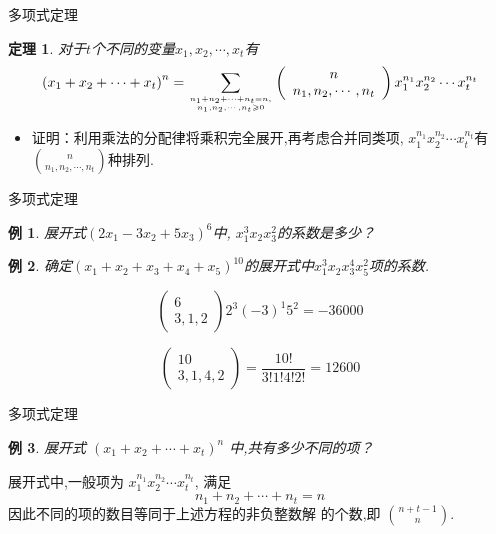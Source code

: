 \documentclass[punct]{ctexbeamer}
\newtheorem{thm}{定理}[section]
\newtheorem{ex}{例}[section]
\begin{document}
\begin{frame}{多项式定理}
	\begin{thm}
	对于$t$个不同的变量$x_{1}, x_{2}, \cdots, x_{t}$有
	$$
	\left(x_{1}+x_{2}+\cdots+x_{t}\right)^{n}=\sum_{n_{1}+n_{2}+\cdots+n_{t}=n, \atop n_{1}, n_{2}, \cdots, n_{t} \geqslant 0}\left(\begin{array}{c}
	n \\ n_{1}, n_{2}, \cdots, n_{t}
	\end{array}\right) x_{1}^{n_{1}} x_{2}^{n_{2}} \cdots x_{t}^{n_{t}}
	$$

	\end{thm}
	\begin{itemize}
	\item  证明：利用乘法的分配律将乘积完全展开,再考虑合并同类项,
	$x_{1}^{n_{1}} x_{2}^{n_{2}} \cdots x_{t}^{n_{t}}$有$\binom{n}{n_{1}, n_{2}, \cdots, n_{t}}$种排列.

	\end{itemize}

\end{frame}


\begin{frame}{多项式定理}


	\begin{ex}
		展开式$(2x_{1}-3x_{2}+5x_{3})^6$中, $x_{1}^{3}x_2x_3^2$的系数是多少？
	\end{ex}

	\begin{ex}
    确定$\left(x_{1}+x_{2}+x_{3}+x_{4}+x_{5}\right)^{10}$的展开式中$ x_{1}^{3} x_{2} x_{3}^{4} x_{5}^{2}$项的系数.
\end{ex}


\pause
		$$
		\left(\begin{array}{c}
		6 \\ 3,1,2
		\end{array}\right) 2^{3}(-3)^{1} 5^{2}=-36000
		$$

\pause
\[\left(\begin{array}{c}
    10 \\
    3,1,4,2
\end{array}\right)=\frac{10 !}{3 ! 1 ! 4 ! 2 !}=12600\]


\end{frame}

\begin{frame}{多项式定理}

	\begin{ex}
		展开式 $\left(x_{1}+x_{2}+\cdots+x_{t}\right)^{n}$ 中,共有多少不同的项？
	\end{ex}
	\pause

		展开式中,一般项为 $x_{1}^{n_{1}} x_{2}^{n_{2}} \cdots x_{t}^{n_{t}}$, 满足 $$n_{1}+n_{2}+\cdots+n_{t}=n$$
		因此不同的项的数目等同于上述方程的非负整数解 的个数,即 $\binom{n+t-1}{n}.$

\end{frame}
\end{document}
